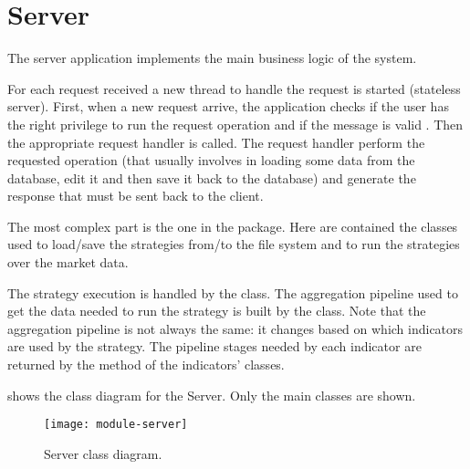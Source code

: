 \section{Server}\label{sec:server}

The server application implements the main business logic of the system.

For each request received a new thread to handle the request is started
(stateless server). First, when a new request arrive, the application checks if
the user has the right privilege to run the request operation and if the message
is valid . Then the appropriate
request handler is called. The request handler perform the requested operation
(that usually involves in loading some data from the database, edit it and then
save it back to the database) and generate the response that must be sent back
to the client.

The most complex part is the one in the  package. Here
are contained the classes used to load/save the strategies from/to the file
system and to run the strategies over the market data.

The strategy execution is handled by the  class. The
aggregation pipeline used to get the data needed to run the strategy is built by
the  class. Note that the aggregation pipeline is not
always the same: it changes based on which indicators are used by the strategy.
The pipeline stages needed by each indicator are returned by the
 method of the indicators' classes.

 shows the class diagram for the Server. Only the main
classes are shown.

\begin{figure}[htb]
	\texttt{[image: module-server]}
	\caption{Server class diagram.}\label{fig:server}
\end{figure}
